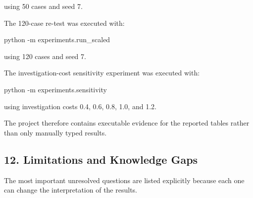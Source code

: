 \documentclass[
]{article}
\newenvironment{Shaded}{}{}
\newcommand{\NormalTok}[1]{#1}
\begin{document}
using 50 cases and seed 7.

The 120-case re-test was executed with:

\begin{Shaded}
\begin{Highlighting}[]
\NormalTok{python {-}m experiments.run\_scaled}
\end{Highlighting}
\end{Shaded}

using 120 cases and seed 7.

The investigation-cost sensitivity experiment was executed with:

\begin{Shaded}
\begin{Highlighting}[]
\NormalTok{python {-}m experiments.sensitivity}
\end{Highlighting}
\end{Shaded}

using investigation costs 0.4, 0.6, 0.8, 1.0, and 1.2.

The project therefore contains executable evidence for the reported
tables rather than only manually typed results.

\subsection{12. Limitations and Knowledge
Gaps}\label{limitations-and-knowledge-gaps}

The most important unresolved questions are listed explicitly because
each one can change the interpretation of the results.
\end{document}
